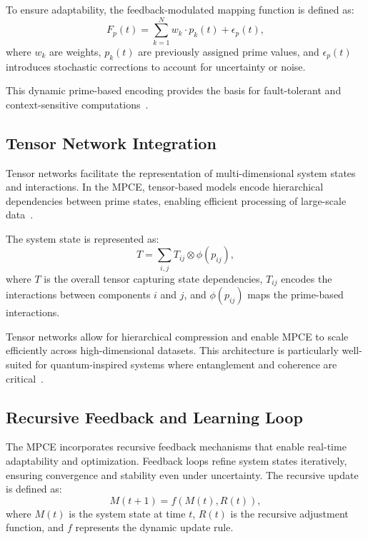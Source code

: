 \documentclass{article}
\theoremstyle{plain}
\begin{document}
To ensure adaptability, the feedback-modulated mapping function is defined as:
\begin{equation}
    F_p(t) = \sum_{k=1}^N w_k \cdot p_k(t) + \epsilon_p(t),
\end{equation}
where \( w_k \) are weights, \( p_k(t) \) are previously assigned prime values, and \( \epsilon_p(t) \) introduces stochastic corrections to account for uncertainty or noise.

This dynamic prime-based encoding provides the basis for fault-tolerant and context-sensitive computations~\cite{shor1994algorithms, haroche2013nobel}.

\subsection{Tensor Network Integration}

Tensor networks facilitate the representation of multi-dimensional system states and interactions. In the MPCE, tensor-based models encode hierarchical dependencies between prime states, enabling efficient processing of large-scale data~\cite{white1992tensor, vidal2003efficient}.

The system state is represented as:
\begin{equation}
    T = \sum_{i, j} T_{ij} \otimes \phi(p_{ij}),
\end{equation}
where \( T \) is the overall tensor capturing state dependencies, \( T_{ij} \) encodes the interactions between components \( i \) and \( j \), and \( \phi(p_{ij}) \) maps the prime-based interactions.

Tensor networks allow for hierarchical compression and enable MPCE to scale efficiently across high-dimensional datasets. This architecture is particularly well-suited for quantum-inspired systems where entanglement and coherence are critical~\cite{vidal2003efficient, wang2021quantum}.

\subsection{Recursive Feedback and Learning Loop}

The MPCE incorporates recursive feedback mechanisms that enable real-time adaptability and optimization. Feedback loops refine system states iteratively, ensuring convergence and stability even under uncertainty. The recursive update is defined as:
\begin{equation}
    M(t+1) = f(M(t), R(t)),
\end{equation}
where \( M(t) \) is the system state at time \( t \), \( R(t) \) is the recursive adjustment function, and \( f \) represents the dynamic update rule.
\end{document}
